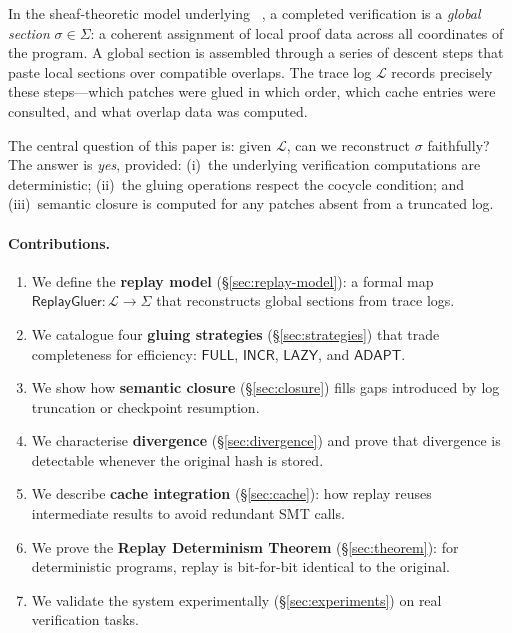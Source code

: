 \documentclass[11pt]{article}
\newcommand{\Gluer}{\mathsf{ReplayGluer}}
\newcommand{\TraceLog}{\mathcal{L}}
\newcommand{\GS}{\sigma}                   %
\newcommand{\GSspace}{\Sigma}              %
\newcommand{\StratFull}{\mathsf{FULL}}
\newcommand{\StratInc}{\mathsf{INCR}}
\newcommand{\StratLazy}{\mathsf{LAZY}}
\newcommand{\StratAdapt}{\mathsf{ADAPT}}
\begin{document}
In the sheaf-theoretic model underlying \JuGeo~\cite{paper01}, a
completed verification is a \emph{global section} $\GS \in \GSspace$: a
coherent assignment of local proof data across all coordinates of the
program.  A global section is assembled through a series of \GLUE{}
descent steps that paste local sections over compatible overlaps.  The
trace log $\TraceLog$ records precisely these steps—which patches were
glued in which order, which cache entries were consulted, and what
overlap data was computed.

The central question of this paper is: given $\TraceLog$, can we
reconstruct $\GS$ faithfully?  The answer is \emph{yes}, provided:
(i)~the underlying verification computations are deterministic; (ii)~the
gluing operations respect the cocycle condition; and (iii)~semantic
closure is computed for any patches absent from a truncated log.

\paragraph{Contributions.}
\begin{enumerate}[leftmargin=1.5em]
\item We define the \textbf{replay model} (\S\ref{sec:replay-model}): a
  formal map $\Gluer\colon \TraceLog \to \GSspace$ that reconstructs
  global sections from trace logs.
\item We catalogue four \textbf{gluing strategies}
  (\S\ref{sec:strategies}) that trade completeness for efficiency:
  $\StratFull$, $\StratInc$, $\StratLazy$, and $\StratAdapt$.
\item We show how \textbf{semantic closure} (\S\ref{sec:closure})
  fills gaps introduced by log truncation or checkpoint resumption.
\item We characterise \textbf{divergence} (\S\ref{sec:divergence}) and
  prove that divergence is detectable whenever the original hash is
  stored.
\item We describe \textbf{cache integration} (\S\ref{sec:cache}):
  how replay reuses intermediate results to avoid redundant SMT calls.
\item We prove the \textbf{Replay Determinism Theorem}
  (\S\ref{sec:theorem}): for deterministic programs, replay is
  bit-for-bit identical to the original.
\item We validate the system experimentally (\S\ref{sec:experiments})
  on \numcases{} real verification tasks.
\end{enumerate}
\end{document}
